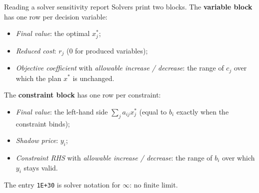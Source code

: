 \begin{rulebox}{Reading a solver sensitivity report}
Solvers print two blocks. The \textbf{variable block} has one row per
decision variable:
\begin{itemize}[leftmargin=1.6em,itemsep=0.3ex]
  \item \emph{Final value}: the optimal $x_{j}^{*}$;
  \item \emph{Reduced cost}: $r_{j}$ ($0$ for produced variables);
  \item \emph{Objective coefficient} with \emph{allowable increase /
        decrease}: the range of $c_{j}$ over which the plan $x^{*}$ is
        unchanged.
\end{itemize}
The \textbf{constraint block} has one row per constraint:
\begin{itemize}[leftmargin=1.6em,itemsep=0.3ex]
  \item \emph{Final value}: the left-hand side $\sum_{j}a_{ij}x_{j}^{*}$
        (equal to $b_{i}$ exactly when the constraint binds);
  \item \emph{Shadow price}: $y_{i}$;
  \item \emph{Constraint RHS} with \emph{allowable increase / decrease}:
        the range of $b_{i}$ over which $y_{i}$ stays valid.
\end{itemize}
The entry \texttt{1E+30} is solver notation for $\infty$: no finite limit.
\end{rulebox}

